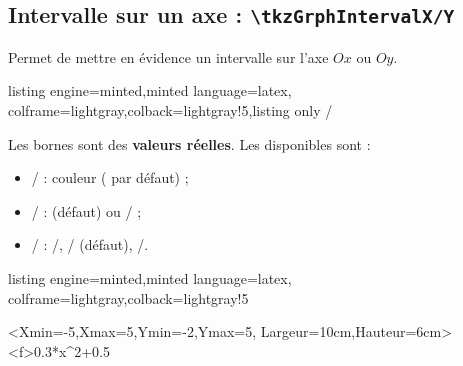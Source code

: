 \documentclass[11pt,a4paper]{ltxdoc}
\begin{document}
\subsection{Intervalle sur un axe : \texttt{\textbackslash tkzGrphIntervalX/Y}}

Permet de mettre en évidence un intervalle sur l'axe $Ox$ ou $Oy$.

\begin{tcblisting}{listing engine=minted,minted language=latex,
  colframe=lightgray,colback=lightgray!5,listing only}
\tkzGrphIntervalleSurOx / \tkzGrphIntervalleSurOy
\end{tcblisting}

Les bornes sont des \textbf{valeurs réelles}. Les \MontreCode{[clés]} disponibles sont :

\begin{itemize}
  \item {} /  : couleur ( par défaut) ;
  \item {} /  :  (défaut) ou / ;
  \item {} /  : /, / (défaut), /.
\end{itemize}

\begin{tcblisting}{listing engine=minted,minted language=latex,
  colframe=lightgray,colback=lightgray!5}
\begin{tkzGrph}<Xmin=-5,Xmax=5,Ymin=-2,Ymax=5,
               Largeur=10cm,Hauteur=6cm>
  \tkzGrphDefineCurve[trace,name=cf,color=red]<f>{0.3*x^2+0.5}
\end{tkzGrph}
\end{tcblisting}
\end{document}
